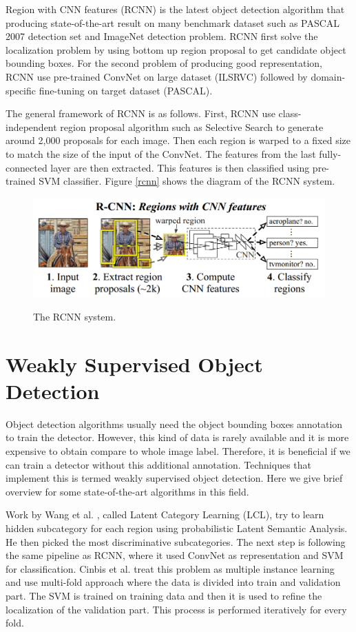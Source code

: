 \documentclass[a4paper,11pt]{kth-mag}
\begin{document}
Region with CNN features (RCNN) is the latest object detection algorithm that producing state-of-the-art result on many benchmark dataset such as PASCAL 2007 detection set and ImageNet detection problem. RCNN first solve the localization problem by using bottom up region proposal to get candidate object bounding boxes. For the second problem of producing good representation, RCNN use pre-trained ConvNet on large dataset (ILSRVC) followed by domain-specific fine-tuning on target dataset (PASCAL).

The general framework of RCNN is as follows. First, RCNN use class-independent region proposal algorithm such as Selective Search to generate around 2,000 proposals for each image. Then each region is warped to a fixed size to match the size of the input of the ConvNet. The features from the last fully-connected layer are then extracted. This features is then classified using pre-trained SVM classifier. Figure \ref{rcnn} shows the diagram of the RCNN system.

\begin{figure}[h]
\centering
\includegraphics[scale=0.5]{image/rcnn.png}
\label{fig:rcnn}
\caption{The RCNN system.}
\end{figure}

\section{Weakly Supervised Object Detection}
Object detection algorithms usually need the object bounding boxes annotation to train the detector. However, this kind of data is rarely available and it is more expensive to obtain compare to whole image label. Therefore, it is beneficial if we can train a detector without this additional annotation. Techniques that implement this is termed weakly supervised object detection. Here we give brief overview for some state-of-the-art algorithms in this field.

Work by Wang et al. \cite{wang2014lcl}, called Latent Category Learning (LCL), try to learn hidden subcategory for each region using probabilistic Latent Semantic Analysis. He then picked the most discriminative subcategories. The next step is following the same pipeline as RCNN, where it used ConvNet as representation and SVM for classification. Cinbis et al. \cite{cinbis2014mil} treat this problem as multiple instance learning and use multi-fold approach where the data is divided into train and validation part. The SVM is trained on training data and then it is used to refine the localization of the validation part. This process is performed iteratively for every fold.
\end{document}

